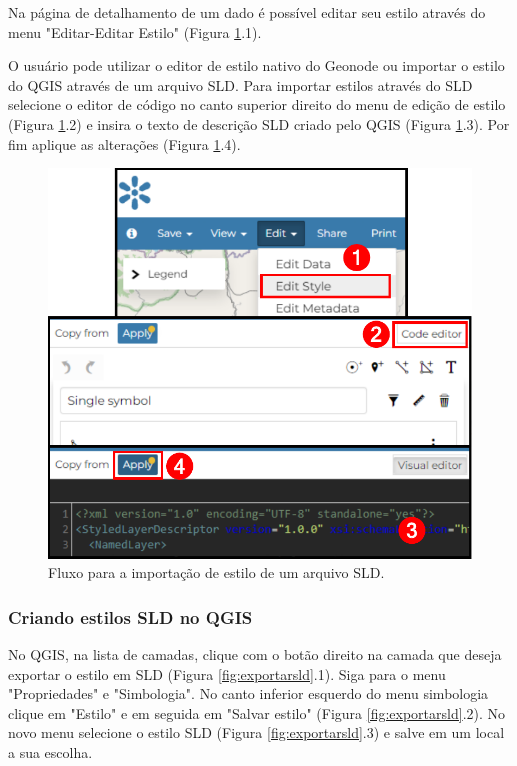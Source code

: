 \documentclass[12pt]{article}
\begin{document}
Na página de detalhamento de um dado é possível editar seu estilo através do
menu "Editar-Editar Estilo" (Figura \ref{fig:estilocodigo}.1).

O usuário pode utilizar o editor de estilo nativo do Geonode ou importar o
estilo do QGIS através de um arquivo SLD. Para importar estilos através do SLD
selecione o editor de código no canto superior direito do menu de edição de
estilo (Figura \ref{fig:estilocodigo}.2) e insira o texto de descrição SLD
criado pelo QGIS (Figura \ref{fig:estilocodigo}.3). Por fim aplique as
alterações (Figura \ref{fig:estilocodigo}.4).

\begin{figure}[ht]
  \centering
  \includegraphics[width=\textwidth, keepaspectratio]{img/estilocodigo.pdf}
  \caption{Fluxo para a importação de estilo de um arquivo SLD.}
  \label{fig:estilocodigo}
\end{figure}

\subsubsection{Criando estilos SLD no QGIS}

No QGIS, na lista de camadas, clique com o botão direito na camada que deseja
exportar o estilo em SLD (Figura \ref{fig:exportarsld}.1). Siga para o menu
"Propriedades" e "Simbologia". No canto inferior esquerdo do menu simbologia
clique em "Estilo" e em seguida em "Salvar estilo" (Figura
\ref{fig:exportarsld}.2). No novo menu selecione o estilo SLD (Figura
\ref{fig:exportarsld}.3) e salve em um local a sua escolha.
\end{document}
